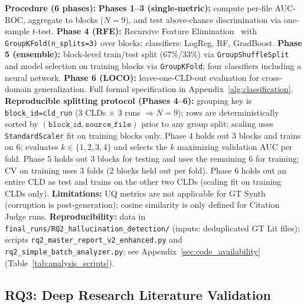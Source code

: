 \noindent\textbf{Procedure (6 phases):} \textbf{Phases 1--3 (single-metric):} compute per-file AUC-ROC, aggregate to blocks ($N{=}9$), and test above-chance discrimination via one-sample $t$-test. \textbf{Phase 4 (RFE):} Recursive Feature Elimination~\cite{pedregosa2011sklearn} with \texttt{GroupKFold(n\_splits=3)} over blocks; classifiers: LogReg, RF, GradBoost. \textbf{Phase 5 (ensemble):} block-level train/test split (67\%/33\%) via \texttt{GroupShuffleSplit} and model selection on training blocks via \texttt{GroupKFold}; four classifiers including a neural network. \textbf{Phase 6 (LOCO):} leave-one-CLD-out evaluation for cross-domain generalization. Full formal specification in Appendix~\ref{alg:classification}. \textbf{Reproducible splitting protocol (Phases 4--6):} grouping key is \texttt{block\_id=cld\_run} (3 CLDs $\times$ 3 runs $\Rightarrow N{=}9$); rows are deterministically sorted by \((\texttt{block\_id}, \texttt{source\_file})\) prior to any group split; scaling uses \texttt{StandardScaler} fit on training blocks only. Phase 4 holds out 3 blocks and trains on 6; evaluates \(k \in \{1,2,3,4\}\) and selects the \(k\) maximizing validation AUC per fold. Phase 5 holds out 3 blocks for testing and uses the remaining 6 for training; CV on training uses 3 folds (2 blocks held out per fold). Phase 6 holds out an entire CLD as test and trains on the other two CLDs (scaling fit on training CLDs only). \textbf{Limitations:} UQ metrics are not applicable for GT Synth (corruption is post-generation); cosine similarity is only defined for Citation Judge runs. \textbf{Reproducibility:} data in \texttt{final\_runs/RQ2\_hallucination\_detection/} (inputs: deduplicated GT Lit files); scripts \texttt{rq2\_master\_report\_v2\_enhanced.py} and \texttt{rq2\_simple\_batch\_analyzer.py}; see Appendix~\ref{sec:code_availability} (Table~\ref{tab:analysis_scripts}).
    
\subsection{RQ3: Deep Research Literature Validation}
\label{sec:rq3_experiments}

\begin{center}
\end{center}

